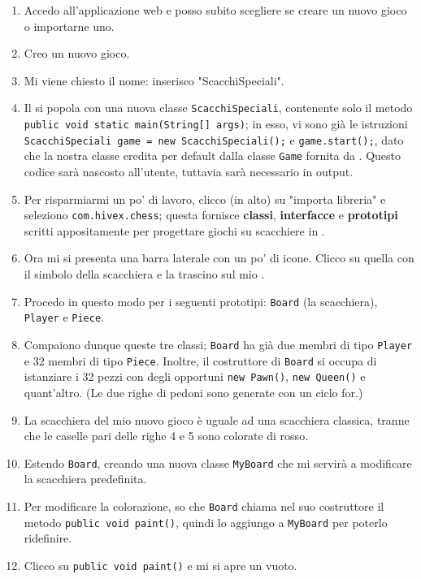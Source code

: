 \begin{enumerate}
	\item Accedo all'applicazione web e posso subito scegliere se creare un nuovo gioco o importarne uno.
	\item Creo un nuovo gioco.
	\item Mi viene chiesto il nome: inserisco "ScacchiSpeciali".
	\item Il  si popola con una nuova classe \texttt{ScacchiSpeciali}, contenente solo il metodo \texttt{public void static main(String[] args)}; in esso, vi sono già le istruzioni \texttt{ScacchiSpeciali game = new ScacchiSpeciali();} e \texttt{game.start();}, dato che la nostra classe eredita per default dalla classe \texttt{Game} fornita da \proj. Questo codice sarà nascosto all'utente, tuttavia sarà necessario in output.
	\item Per risparmiarmi un po' di lavoro, clicco (in alto) su "importa libreria" e seleziono \texttt{com.hivex.chess}; questa fornisce \textbf{classi}, \textbf{interfacce} e \textbf{prototipi} scritti appositamente per progettare giochi su scacchiere in \proj.
	\item Ora mi si presenta una barra laterale con un po' di icone. Clicco su quella con il simbolo della scacchiera e la trascino sul mio .
	\item Procedo in questo modo per i seguenti prototipi: \texttt{Board} (la scacchiera), \texttt{Player} e \texttt{Piece}.
	\item Compaiono dunque queste tre classi; \texttt{Board} ha già due membri di tipo \texttt{Player} e 32 membri di tipo \texttt{Piece}. Inoltre, il costruttore di \texttt{Board} si occupa di istanziare i 32 pezzi con degli opportuni \texttt{new Pawn()}, \texttt{new Queen()} e quant'altro. (Le due righe di pedoni sono generate con un ciclo for.)
	\item La scacchiera del mio nuovo gioco è uguale ad una scacchiera classica, tranne che le caselle pari delle righe 4 e 5 sono colorate di rosso.
	\item Estendo \texttt{Board}, creando una nuova classe \texttt{MyBoard} che mi servirà a modificare la scacchiera predefinita.
	\item Per modificare la colorazione, so che \texttt{Board} chiama nel suo costruttore il metodo \texttt{public void paint()}, quindi lo aggiungo a \texttt{MyBoard} per poterlo ridefinire.
	\item Clicco su \texttt{public void paint()} e mi si apre un  vuoto.

\end{enumerate}
